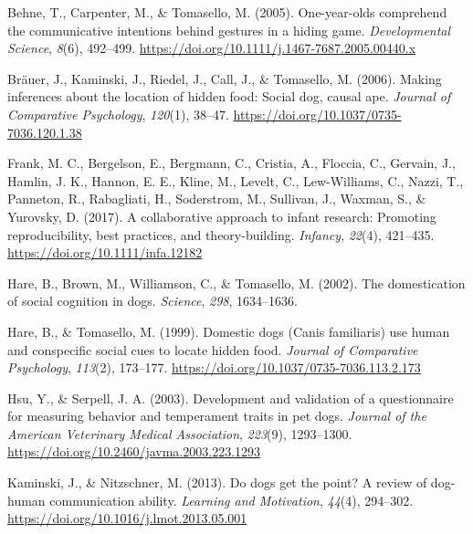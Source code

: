 \documentclass[
  man,floatsintext]{apa6}
\newlength{\cslhangindent}
\newlength{\cslentryspacingunit} %
\newenvironment{CSLReferences}[2] %
 {%
  \setlength{\parindent}{0pt}
  \ifodd #1
  \let\oldpar\par
  \def\par{\hangindent=\cslhangindent\oldpar}
  \fi
  \setlength{\parskip}{#2\cslentryspacingunit}
 }%
 {}
\begin{document}
\hypertarget{refs}{}
\begin{CSLReferences}{1}{0}
\leavevmode{}%
Behne, T., Carpenter, M., \& Tomasello, M. (2005). One-year-olds comprehend the communicative intentions behind gestures in a hiding game. \emph{Developmental Science}, \emph{8}(6), 492--499. \url{https://doi.org/10.1111/j.1467-7687.2005.00440.x}

\leavevmode{}%
Bräuer, J., Kaminski, J., Riedel, J., Call, J., \& Tomasello, M. (2006). Making inferences about the location of hidden food: {Social} dog, causal ape. \emph{Journal of Comparative Psychology}, \emph{120}(1), 38--47. \url{https://doi.org/10.1037/0735-7036.120.1.38}

\leavevmode{}%
Frank, M. C., Bergelson, E., Bergmann, C., Cristia, A., Floccia, C., Gervain, J., Hamlin, J. K., Hannon, E. E., Kline, M., Levelt, C., Lew-Williams, C., Nazzi, T., Panneton, R., Rabagliati, H., Soderstrom, M., Sullivan, J., Waxman, S., \& Yurovsky, D. (2017). A collaborative approach to infant research: Promoting reproducibility, best practices, and theory-building. \emph{Infancy}, \emph{22}(4), 421--435. \url{https://doi.org/10.1111/infa.12182}

\leavevmode{}%
Hare, B., Brown, M., Williamson, C., \& Tomasello, M. (2002). The domestication of social cognition in dogs. \emph{Science}, \emph{298}, 1634--1636.

\leavevmode{}%
Hare, B., \& Tomasello, M. (1999). Domestic dogs ({Canis} familiaris) use human and conspecific social cues to locate hidden food. \emph{Journal of Comparative Psychology}, \emph{113}(2), 173--177. \url{https://doi.org/10.1037/0735-7036.113.2.173}

\leavevmode{}%
Hsu, Y., \& Serpell, J. A. (2003). Development and validation of a questionnaire for measuring behavior and temperament traits in pet dogs. \emph{Journal of the American Veterinary Medical Association}, \emph{223}(9), 1293--1300. \url{https://doi.org/10.2460/javma.2003.223.1293}

\leavevmode{}%
Kaminski, J., \& Nitzschner, M. (2013). Do dogs get the point? {A} review of dog-human communication ability. \emph{Learning and Motivation}, \emph{44}(4), 294--302. \url{https://doi.org/10.1016/j.lmot.2013.05.001}


\end{CSLReferences}
\end{document}
